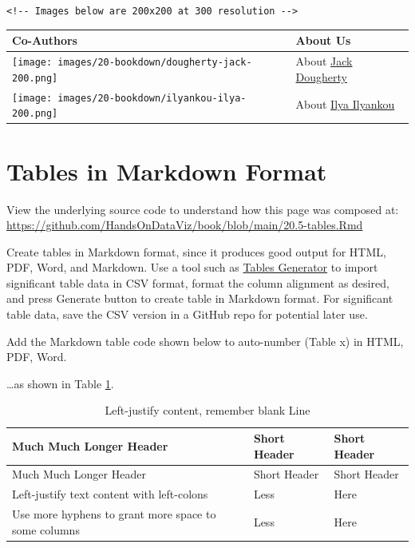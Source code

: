 \documentclass[
  english,
]{book}
\begin{document}
\texttt{\textless{}!-\/-\ Images\ below\ are\ 200x200\ at\ 300\ resolution\ -\/-\textgreater{}}

\begin{longtable}[]{@{}ll@{}}
\toprule
Co-Authors & About Us \\
\midrule
\endhead
\texttt{[image: images/20-bookdown/dougherty-jack-200.png]} & About \href{https://jackdougherty.org}{Jack Dougherty} \\
\texttt{[image: images/20-bookdown/ilyankou-ilya-200.png]} & About \href{https://github.com/ilyankou}{Ilya Ilyankou} \\
\bottomrule
\end{longtable}

\hypertarget{tables}{%
\section*{Tables in Markdown Format}\label{tables}}

View the underlying source code to understand how this page was composed at: \url{https://github.com/HandsOnDataViz/book/blob/main/20.5-tables.Rmd}

Create tables in Markdown format, since it produces good output for HTML, PDF, Word, and Markdown. Use a tool such as \href{https://www.tablesgenerator.com/markdown_tables}{Tables Generator} to import significant table data in CSV format, format the column alignment as desired, and press Generate button to create table in Markdown format. For significant table data, save the CSV version in a GitHub repo for potential later use.

Add the Markdown table code shown below to auto-number (Table x) in HTML, PDF, Word.

\ldots as shown in Table \ref{tab:left-table}.

\begin{longtable}[]{@{}lll@{}}
\caption{\label{tab:left-table} Left-justify content, remember blank Line}\tabularnewline
\toprule
Much Much Longer Header & Short Header & Short Header \\
\midrule
\endfirsthead
\toprule
Much Much Longer Header & Short Header & Short Header \\
\midrule
\endhead
Left-justify text content with left-colons & Less & Here \\
Use more hyphens to grant more space to some columns & Less & Here \\
\bottomrule
\end{longtable}
\end{document}
